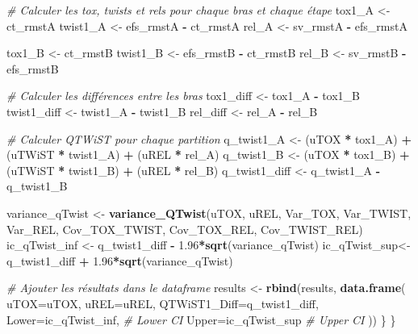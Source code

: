 \documentclass[
]{article}
\newenvironment{Shaded}{\begin{snugshade}}{\end{snugshade}}
\newcommand{\AttributeTok}[1]{\textcolor[rgb]{0.13,0.29,0.53}{#1}}
\newcommand{\CommentTok}[1]{\textcolor[rgb]{0.56,0.35,0.01}{\textit{#1}}}
\newcommand{\FloatTok}[1]{\textcolor[rgb]{0.00,0.00,0.81}{#1}}
\newcommand{\FunctionTok}[1]{\textcolor[rgb]{0.13,0.29,0.53}{\textbf{#1}}}
\newcommand{\NormalTok}[1]{#1}
\newcommand{\OtherTok}[1]{\textcolor[rgb]{0.56,0.35,0.01}{#1}}
\newcommand{\SpecialCharTok}[1]{\textcolor[rgb]{0.81,0.36,0.00}{\textbf{#1}}}
\begin{document}
\begin{Shaded}
\begin{Highlighting}[]
  \CommentTok{\# Calculer les tox, twists et rels pour chaque bras et chaque étape}
\NormalTok{  tox1\_A }\OtherTok{\textless{}{-}}\NormalTok{ ct\_rmstA}
\NormalTok{  twist1\_A }\OtherTok{\textless{}{-}}\NormalTok{ efs\_rmstA }\SpecialCharTok{{-}}\NormalTok{ ct\_rmstA}
\NormalTok{  rel\_A }\OtherTok{\textless{}{-}}\NormalTok{ sv\_rmstA }\SpecialCharTok{{-}}\NormalTok{ efs\_rmstA}
  
\NormalTok{  tox1\_B }\OtherTok{\textless{}{-}}\NormalTok{ ct\_rmstB}
\NormalTok{  twist1\_B }\OtherTok{\textless{}{-}}\NormalTok{ efs\_rmstB }\SpecialCharTok{{-}}\NormalTok{ ct\_rmstB}
\NormalTok{  rel\_B }\OtherTok{\textless{}{-}}\NormalTok{ sv\_rmstB }\SpecialCharTok{{-}}\NormalTok{ efs\_rmstB}
  
  \CommentTok{\# Calculer les différences entre les bras}
\NormalTok{  tox1\_diff }\OtherTok{\textless{}{-}}\NormalTok{ tox1\_A }\SpecialCharTok{{-}}\NormalTok{ tox1\_B}
\NormalTok{  twist1\_diff }\OtherTok{\textless{}{-}}\NormalTok{ twist1\_A }\SpecialCharTok{{-}}\NormalTok{ twist1\_B}
\NormalTok{  rel\_diff }\OtherTok{\textless{}{-}}\NormalTok{ rel\_A }\SpecialCharTok{{-}}\NormalTok{ rel\_B}
  
  \CommentTok{\# Calculer QTWiST pour chaque partition}
\NormalTok{  q\_twist1\_A }\OtherTok{\textless{}{-}}\NormalTok{ (uTOX }\SpecialCharTok{*}\NormalTok{ tox1\_A) }\SpecialCharTok{+}\NormalTok{ (uTWiST }\SpecialCharTok{*}\NormalTok{ twist1\_A) }\SpecialCharTok{+}\NormalTok{ (uREL }\SpecialCharTok{*}\NormalTok{ rel\_A)}
\NormalTok{  q\_twist1\_B }\OtherTok{\textless{}{-}}\NormalTok{ (uTOX }\SpecialCharTok{*}\NormalTok{ tox1\_B) }\SpecialCharTok{+}\NormalTok{ (uTWiST }\SpecialCharTok{*}\NormalTok{ twist1\_B) }\SpecialCharTok{+}\NormalTok{ (uREL }\SpecialCharTok{*}\NormalTok{ rel\_B)}
\NormalTok{  q\_twist1\_diff }\OtherTok{\textless{}{-}}\NormalTok{ q\_twist1\_A }\SpecialCharTok{{-}}\NormalTok{ q\_twist1\_B}
  
\NormalTok{  variance\_qTwist }\OtherTok{\textless{}{-}} \FunctionTok{variance\_QTwist}\NormalTok{(uTOX, uREL, Var\_TOX, Var\_TWIST, Var\_REL, Cov\_TOX\_TWIST, Cov\_TOX\_REL, Cov\_TWIST\_REL)}
\NormalTok{  ic\_qTwist\_inf }\OtherTok{\textless{}{-}}\NormalTok{ q\_twist1\_diff }\SpecialCharTok{{-}} \FloatTok{1.96}\SpecialCharTok{*}\FunctionTok{sqrt}\NormalTok{(variance\_qTwist)}
\NormalTok{  ic\_qTwist\_sup}\OtherTok{\textless{}{-}}\NormalTok{q\_twist1\_diff }\SpecialCharTok{+} \FloatTok{1.96}\SpecialCharTok{*}\FunctionTok{sqrt}\NormalTok{(variance\_qTwist)}
  
      \CommentTok{\# Ajouter les résultats dans le dataframe}
\NormalTok{  results }\OtherTok{\textless{}{-}} \FunctionTok{rbind}\NormalTok{(results, }\FunctionTok{data.frame}\NormalTok{(}
      \AttributeTok{uTOX=}\NormalTok{uTOX, }
      \AttributeTok{uREL=}\NormalTok{uREL, }
      \AttributeTok{QTWiST1\_Diff=}\NormalTok{q\_twist1\_diff, }
      \AttributeTok{Lower=}\NormalTok{ic\_qTwist\_inf, }\CommentTok{\# Lower CI}
      \AttributeTok{Upper=}\NormalTok{ic\_qTwist\_sup  }\CommentTok{\# Upper CI}
\NormalTok{    ))}
\NormalTok{  \}}
\NormalTok{\}}
\end{Highlighting}
\end{Shaded}
\end{document}
